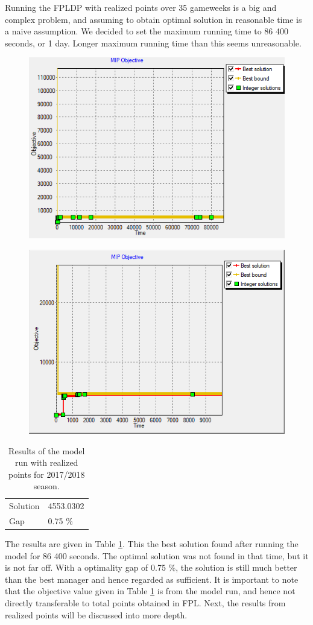 Running the FPLDP with realized points over 35 gameweeks is a big and complex problem, and assuming to obtain optimal solution in reasonable time is a naive assumption. We decided to set the maximum running time to 86 400 seconds, or 1 day. Longer maximum running time than this seems unreasonable. 

\newpar

\begin{figure}[H]
\centering
\begin{minipage}{.5\textwidth}
  \centering
  \includegraphics[width=.4\linewidth]{fig/chapter_7/solution_edit_found.png}
  \label{fig:solution_found}
\end{minipage}%
\begin{minipage}{.5\textwidth}
  \centering
  \includegraphics[width=.4\linewidth]{fig/chapter_7/solution_found_edit_zoom_1.png}
  \label{fig:solution_found_zoom}
\end{minipage}
\end{figure}

\begin{table}[H]
\centering
\begin{tabular}{@{}ll@{}}
\toprule
         &           \\ 
\midrule
Solution & 4553.0302 \\
Gap      & 0.75 \%   \\ 
\bottomrule
\end{tabular}
\caption{Results of the model run with realized points for 2017/2018 season.}
\label{tab:results_realized_points}
\end{table}


The results are given in Table \ref{tab:results_realized_points}. This the best solution found after running the model for 86 400 seconds. The optimal solution was not found in that time, but it is not far off. With a optimality gap of 0.75 \%, the solution is still much better than the best manager and hence regarded as sufficient. It is important to note that the objective value given in
Table \ref{tab:results_realized_points} is from the model run, and hence not directly transferable to total points obtained in FPL. Next, the results from realized points will be discussed into more depth. 



